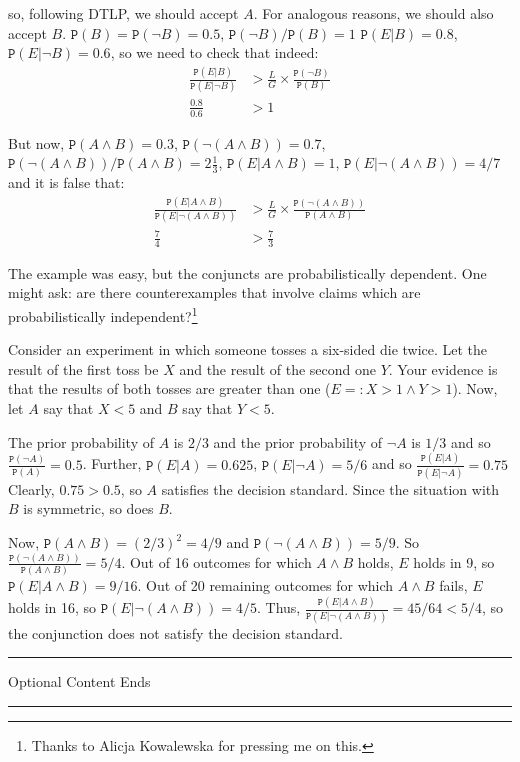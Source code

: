 \documentclass{ifcolog}
\newcommand{\intermezzob}{\nopagebreak 
	\begin{minipage}[c]{13cm}
	\begin{center}\rule{10cm}{0.4pt}

	\tiny{\sc Optional Content Ends}
	
	\vspace{-1mm}
	
	\rule{10cm}{0.4pt}\end{center}
	\end{minipage}
	}
\newcommand{\pr}[1]{\mbox{$\mathtt{P}(#1)$}}
\newcommand{\n}{\neg}
\newcommand{\et}{\wedge}
\begin{document}
 \noindent so, following DTLP, we should accept $A$.  
  For analogous reasons, we should also accept $B$. $\pr{B}=\pr{\n B}=0.5$, $\pr{\n B}/\pr{B}=1$ $\pr{E\vert B}=0.8$, $\pr{E\vert \n B}=0.6$, so we need  to check that indeed:
 \begin{align*}
 \frac{\pr{E\vert B}}{\pr{E\vert \n B}}&> \frac{L}{G}\times \frac{\pr{\n B}}{\pr{B}}\\
 \frac{0.8}{0.6} & > 1 
 \end{align*}

 But now, $\pr{A\et B}=0.3$, $\pr{\n (A \et B)}=0.7$, $\pr{\n (A\et B)}/\pr{A\et B}=2\frac{1}{3}$, $\pr{E\vert A \et B}=1$, $\pr{E\vert \n (A\et B)}=4/7$ and it is false that:
  \begin{align*}
 \frac{\pr{E\vert A \et B}}{\pr{E\vert \n (A\et B)}}&> \frac{L}{G}\times \frac{\pr{\n (A \et B)}}{\pr{A \et B}}\\
 \frac{7}{4} & > \frac{7}{3} 
 \end{align*}

The example was easy, but the conjuncts are probabilistically dependent. One might ask: are there counterexamples that  involve claims which are  probabilistically independent?\footnote{Thanks to Alicja Kowalewska for pressing me on this.} 

Consider an experiment in which someone tosses a six-sided die twice. Let the result of the first toss be $X$ and the result of the second one $Y$. Your evidence is that the results of both tosses are greater than one ($E=: X>1 \et Y>1$). Now, let $A$ say that $X<5$ and $B$ say that $Y<5$.

The prior probability of $A$ is $2/3$ and the prior probability of $\n A$ is $1/3$ and so $\frac{\pr{\n A}}{\pr{A}}=0.5$. Further, $\pr{E\vert A}=0.625$, $\pr{E\vert \n A}= 5/6$ and so $\frac{\pr{E\vert A}}{\pr{E\vert \n A}}=0.75$ Clearly, $0.75>0.5$, so $A$ satisfies the decision standard. Since the situation with $B$ is symmetric, so does $B$. 

 Now, $\pr{A\et B}=(2/3)^2=4/9$ and $\pr{\n (A\et B)}=5/9$. So $\frac{\pr{\n(A\et B)}}{\pr{A\et B}}=5/4$. 
 Out of 16 outcomes for which $A\et B$ holds, $E$ holds in 9, so $\pr{E\vert A\et B}=9/16$. Out of 20 remaining outcomes for which $A\et B$ fails, $E$ holds in 16, so
  $\pr{E\vert \n (A\et B)}=4/5$. Thus, $\frac{\pr{E\vert A\et B}}{\pr{E\vert \n (A\et B)}}=45/64 <5/4$, so the conjunction does not satisfy the decision standard.



\intermezzob
\end{document}
